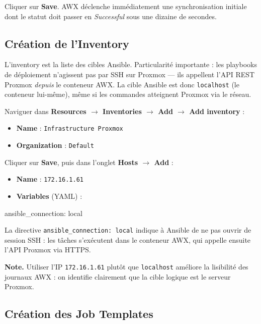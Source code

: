 \documentclass[a4paper]{article}
\newcommand{\cmd}[1]{\texttt{#1}}
\begin{document}
Cliquer sur \textbf{Save}. AWX déclenche immédiatement une synchronisation initiale dont le statut doit passer en \textit{Successful} sous une dizaine de secondes.

\subsection{Création de l'Inventory}

L'inventory est la liste des cibles Ansible. Particularité importante : les playbooks de déploiement n'agissent pas par SSH sur Proxmox --- ils appellent l'API REST Proxmox \textit{depuis} le conteneur AWX. La cible Ansible est donc \cmd{localhost} (le conteneur lui-même), même si les commandes atteignent Proxmox via le réseau.

Naviguer dans \textbf{Resources \(\to\) Inventories \(\to\) Add \(\to\) Add inventory} :

\begin{itemize}
  \item \textbf{Name} : \cmd{Infrastructure Proxmox}
  \item \textbf{Organization} : \cmd{Default}
\end{itemize}

Cliquer sur \textbf{Save}, puis dans l'onglet \textbf{Hosts \(\to\) Add} :

\begin{itemize}
  \item \textbf{Name} : \cmd{172.16.1.61}
  \item \textbf{Variables} (YAML) :
\end{itemize}

\begin{yamlcode}
ansible_connection: local
\end{yamlcode}

La directive \cmd{ansible\_connection: local} indique à Ansible de ne pas ouvrir de session SSH : les tâches s'exécutent dans le conteneur AWX, qui appelle ensuite l'API Proxmox via HTTPS.

\begin{infobox}
  \textbf{Note.} Utiliser l'IP \cmd{172.16.1.61} plutôt que \cmd{localhost} améliore la lisibilité des journaux AWX : on identifie clairement que la cible logique est le serveur Proxmox.
\end{infobox}

\subsection{Création des Job Templates}
\end{document}
